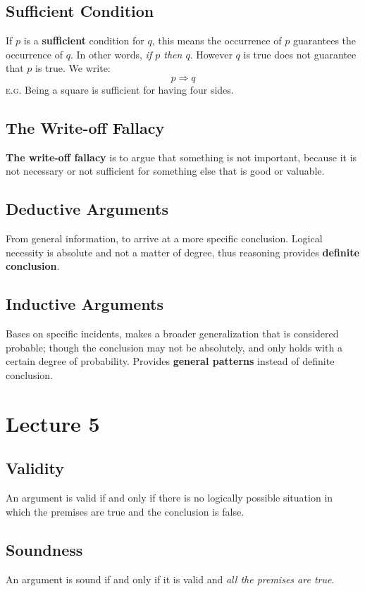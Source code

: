 \documentclass{article}
\begin{document}
\subsection{Sufficient Condition}
If $p$ is a \textbf{sufficient} condition for $q$, this means the occurrence of $p$ guarantees the occurrence of $q$. In other words, \emph{if $p$ then $q$}. However $q$ is true does not guarantee that $p$ is true. We write:
$$ p \Rightarrow q $$
\textsc{e.g.} Being a square is sufficient for having four sides.

\subsection{The Write-off Fallacy}
\textbf{The write-off fallacy} is to argue that something is not important, because it is not necessary or not sufficient for something else that is good or valuable.

\subsection{Deductive Arguments}
From general information, to arrive at a more specific conclusion. Logical necessity is absolute and not a matter of degree, thus reasoning provides \textbf{definite conclusion}.

\subsection{Inductive Arguments}
Bases on specific incidents, makes a broader generalization that is considered probable; though the conclusion may not be absolutely, and only holds with a certain degree of probability. Provides \textbf{general patterns} instead of definite conclusion.

\section{Lecture 5}

\subsection{Validity}
An argument is valid if and only if there is no logically possible situation in which the premises are true and the conclusion is false.

\subsection{Soundness}
An argument is sound if and only if it is valid and \emph{all the premises are true}.
\end{document}

